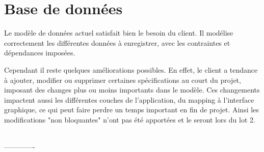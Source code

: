 
\section{Base de données}

Le modèle de données actuel satisfait bien le besoin du client. Il modélise correctement les différentes données à enregistrer, avec les contraintes et dépendances imposées.

Cependant il reste quelques améliorations possibles. En effet, le client a tendance à ajouter, modifier ou supprimer certaines spécifications au court du projet, imposant des changes plus ou moins importants dans le modèle. Ces changements impactent aussi les différentes couches de l'application, du mapping à l'interface graphique, ce qui peut faire perdre un temps important en fin de projet. Ainsi les modifications "non bloquantes" n'ont pas été apportées et le seront lors du lot 2.





~~\\-------------
